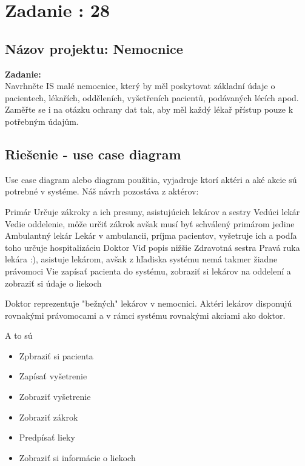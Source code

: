 \section{Zadanie : 28}

\subsection{Názov projektu: Nemocnice}

\noindent\textbf{Zadanie:} \\
\indent Navrhněte IS malé nemocnice, který by měl poskytovat základní údaje o pacientech, lékařích, odděleních, vyšetřeních
pacientů, podávaných lécích apod. Zaměřte se i na otázku ochrany dat tak, aby měl každý lékař přístup pouze k potřebným
údajům.

\subsection{Riešenie - use case diagram}
Use case diagram alebo diagram použitia, vyjadruje ktorí aktéri a aké akcie sú potrebné v systéme.
Náš návrh pozostáva z aktérov:
\begin{outline}
    \1 Primár
    \2 Určuje zákroky a ich presuny, asistujúcich lekárov a sestry
    \1 Vedúci lekár
    \2 Vedie oddelenie, môže určiť zákrok avšak musí byť schválený primárom jedine
    \1 Ambulantný lekár
    \2 Lekár v ambulancii, príjma pacientov, vyšetruje ich a podľa toho určuje hospitalizáciu
    \1 Doktor
    \2 Viď popis nižšie
    \1 Zdravotná sestra
    \2 Pravá ruka lekára :), asistuje lekárom, avšak z hľadiska systému nemá takmer žiadne právomoci
    \2 Vie zapísať pacienta do systému, zobraziť si lekárov na oddelení a zobraziť si údaje o liekoch
\end{outline}

Doktor reprezentuje "bežných"  lekárov v nemocnici.
Aktéri lekárov disponujú rovnakými právomocami a v rámci systému rovnakými akciami ako doktor.

A to sú
\begin{itemize}
    \item Zpbraziť si pacienta
    \item Zapísať vyšetrenie
    \item Zobraziť vyšetrenie
    \item Zobraziť zákrok
    \item Predpísať lieky
    \item Zobraziť si informácie o liekoch
\end{itemize}

